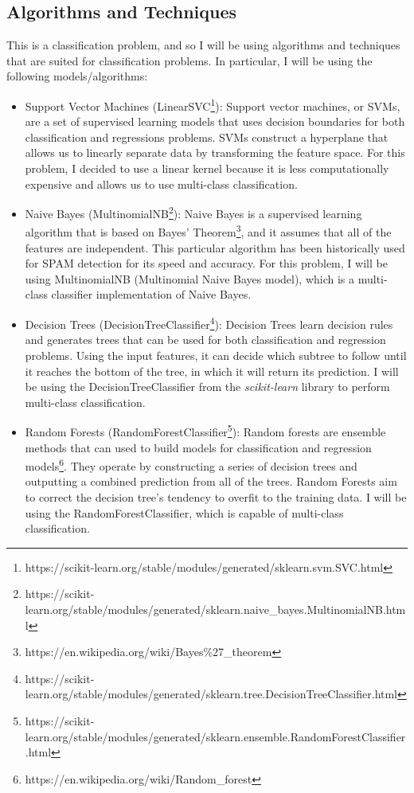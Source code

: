 \documentclass[12pt]{article}
\begin{document}
\subsection{Algorithms and Techniques}
This is a classification problem, and so I will be using algorithms and techniques that are suited for classification problems. In particular, I will be using the following models/algorithms:

\begin{itemize}
	\item Support Vector Machines (LinearSVC\footnote{https://scikit-learn.org/stable/modules/generated/sklearn.svm.SVC.html}): Support vector machines, or SVMs, are a set of supervised learning models that uses decision boundaries for both classification and regressions problems. SVMs construct a hyperplane that allows us to linearly separate data by transforming the feature space. For this problem, I decided to use a linear kernel because it is less computationally expensive and allows us to use multi-class classification.
	\item Naive Bayes (MultinomialNB\footnote{https://scikit-learn.org/stable/modules/generated/sklearn.naive\_bayes.MultinomialNB.html}): Naive Bayes is a supervised learning algorithm that is based on Bayes' Theorem\footnote{https://en.wikipedia.org/wiki/Bayes\%27\_theorem}, and it assumes that all of the features are independent. This particular algorithm has been historically used for SPAM detection for its speed and accuracy. For this problem, I will be using MultinomialNB (Multinomial Naive Bayes model), which is a multi-class classifier implementation of Naive Bayes.
	\item Decision Trees (DecisionTreeClassifier\footnote{https://scikit-learn.org/stable/modules/generated/sklearn.tree.DecisionTreeClassifier.html}): Decision Trees learn decision rules and generates trees that can be used for both classification and regression problems. Using the input features, it can decide which subtree to follow until it reaches the bottom of the tree, in which it will return its prediction. I will be using the DecisionTreeClassifier from the \textit{scikit-learn} library to perform multi-class classification.
	\item Random Forests (RandomForestClassifier\footnote{https://scikit-learn.org/stable/modules/generated/sklearn.ensemble.RandomForestClassifier.html}): Random forests are ensemble methods that can used to build models for classification and regression models\footnote{https://en.wikipedia.org/wiki/Random\_forest}. They operate by constructing a series of decision trees and outputting a combined prediction from all of the trees. Random Forests aim to correct the decision tree's tendency to overfit to the training data. I will be using the RandomForestClassifier, which is capable of multi-class classification.

\end{itemize}
\end{document}
